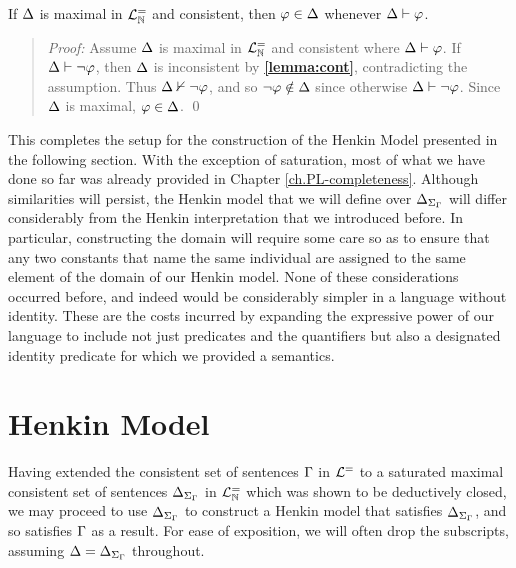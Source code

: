 \begin{Lthm} \label{lemma:deductive}
  If $\Delta$ is maximal in $\mathcal{L}^{=}_{\mathbb{N}}$ and consistent, then $\varphi\in\Delta$ whenever $\Delta\vdash\varphi$.
\end{Lthm}

\begin{quote} 
  \textit{Proof:} Assume $\Delta$ is maximal in $\mathcal{L}^{=}_{\mathbb{N}}$ and consistent where $\Delta\vdash\varphi$.
  If $\Delta\vdash\neg\varphi$, then $\Delta$ is inconsistent by \textbf{\ref{lemma:cont}}, contradicting the assumption.
  Thus $\Delta\nvdash\neg\varphi$, and so $\neg\varphi\notin\Delta$ since otherwise $\Delta\vdash\neg\varphi$. 
  Since $\Delta$ is maximal, $\varphi\in\Delta$. 
  \qed
\end{quote}

This completes the setup for the construction of the Henkin Model presented in the following section.
With the exception of saturation, most of what we have done so far was already provided in Chapter \ref{ch.PL-completeness}.
Although similarities will persist, the Henkin model that we will define over $\Delta_{\Sigma_{\Gamma}}$ will differ considerably from the Henkin interpretation that we introduced before. 
In particular, constructing the domain will require some care so as to ensure that any two constants that name the same individual are assigned to the same element of the domain of our Henkin model.
None of these considerations occurred before, and indeed would be considerably simpler in a language without identity.
These are the costs incurred by expanding the expressive power of our language to include not just predicates and the quantifiers but also a designated identity predicate for which we provided a semantics.





\section{Henkin Model}%
  \label{sub:HenkinModel}

Having extended the consistent set of sentences $\Gamma$ in $\mathcal{L}^{=}$ to a saturated maximal consistent set of sentences $\Delta_{\Sigma_{\Gamma}}$ in $\mathcal{L}^{=}_{\mathbb{N}}$ which was shown to be deductively closed, we may proceed to use $\Delta_{\Sigma_{\Gamma}}$ to construct a Henkin model that satisfies $\Delta_{\Sigma_{\Gamma}}$, and so satisfies $\Gamma$ as a result.
For ease of exposition, we will often drop the subscripts, assuming $\Delta=\Delta_{\Sigma_{\Gamma}}$ throughout.

